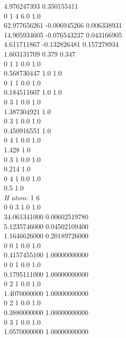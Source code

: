\documentclass[11pt,DIV=13,BCOR=5mm,a4paper,headinclude]{scrbook}
\begin{document}
\begin{spacing}{0.5}
{4.976247393       0.350155411\\
0 1 4 6.0 1.0\\

62.977656261     -0.006945266     0.006338931\\

14.905934605     -0.076543237     0.043166905\\

4.611711867      -0.132826481     0.157278934\\

1.603131709       0.379           0.347\\
0 1 1 0.0 1.0\\

0.568730447       1.0             1.0\\
0 1 1 0.0 1.0\\

0.184511607       1.0             1.0\\
0 3 1 0.0 1.0\\

1.387304921       1.0\\
0 3 1 0.0 1.0\\

0.450916551       1.0\\
0 4 1 0.0 1.0\\

1.428             1.0\\
0 3 1 0.0 1.0\\

0.214             1.0\\
0 4 1 0.0 1.0\\

0.5               1.0\\

\textit{H atom: }
1 6\\
0 0 3 1.0 1.0\\

34.061341000 0.00602519780\\

5.1235746000 0.04502109400\\

1.1646626000 0.20189726000\\
0 0 1 0.0 1.0\\

0.4157455100 1.00000000000\\
0 0 1 0.0 1.0\\

0.1795111000 1.00000000000\\
0 2 1 0.0 1.0\\

1.4070000000 1.00000000000\\
0 2 1 0.0 1.0\\

0.3880000000 1.00000000000\\
0 3 1 0.0 1.0\\

1.0570000000 1.00000000000}
\end{spacing}
\end{document}
